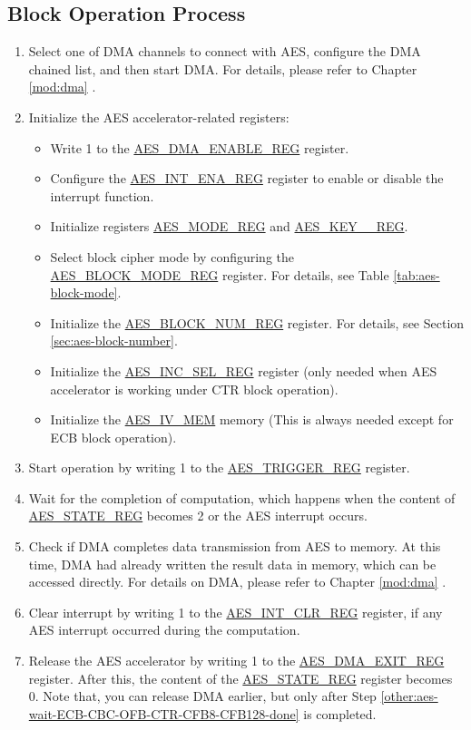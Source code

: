\documentclass[main\_\_EN.tex]{subfiles}
\begin{document}
\subsection{Block Operation Process}
\begin{enumerate}
    \item Select one of DMA channels to connect with AES, configure the DMA chained list, and then start DMA. For details, please refer to Chapter \ref{mod:dma} \textit{}.
    \item Initialize the AES accelerator-related registers:
    \begin{itemize}
        \item Write 1 to the \hyperref[regdesc:AESDMAENABLEREG]{AES\_DMA\_ENABLE\_REG} register.
        \item Configure the \hyperref[regdesc:AESINTENAREG]{AES\_INT\_ENA\_REG} register to enable or disable the interrupt function.
        \item Initialize registers \hyperref[regdesc:AESMODEREG]{AES\_MODE\_REG} and \hyperref[regdesc:AESKEYnREG]{AES\_KEY\_\_REG}.
        \item Select block cipher mode by configuring the \hyperref[regdesc:AESBLOCKMODEREG]{AES\_BLOCK\_MODE\_REG} register. For details, see Table \ref{tab:aes-block-mode}.
        \item Initialize the \hyperref[regdesc:AESBLOCKNUMREG]{AES\_BLOCK\_NUM\_REG} register. For details, see Section \ref{sec:aes-block-number}.
        \item Initialize the \hyperref[regdesc:AESINCSELREG]{AES\_INC\_SEL\_REG} register (only needed when AES accelerator is working under CTR block operation).
        \item Initialize the \hyperref[memdesc:AESIVMEM]{AES\_IV\_MEM} memory (This is always needed except for ECB block operation).
    \end{itemize}
    \item Start operation by writing 1 to the \hyperref[regdesc:AESTRIGGERREG]{AES\_TRIGGER\_REG} register.
    \item \label{other:aes-wait-ECB-CBC-OFB-CTR-CFB8-CFB128-done}
            Wait for the completion of computation, which happens when the content of \hyperref[regdesc:AESSTATEREG]{AES\_STATE\_REG} becomes 2 or the AES interrupt occurs.
    \item Check if DMA completes data transmission from AES to memory. At this time, DMA had already written the result data in memory, which can be accessed directly. For details on DMA, please refer to Chapter \ref{mod:dma} \textit{}.
    \item Clear interrupt by writing 1 to the \hyperref[regdesc:AESINTCLRREG]{AES\_INT\_CLR\_REG} register, if any AES interrupt occurred during the computation.
    \item Release the AES accelerator by writing 1 to the \hyperref[regdesc:AESDMAEXITREG]{AES\_DMA\_EXIT\_REG} register. After this, the content of the \hyperref[regdesc:AESSTATEREG]{AES\_STATE\_REG} register becomes 0.
    Note that, you can release DMA earlier, but only after Step \ref{other:aes-wait-ECB-CBC-OFB-CTR-CFB8-CFB128-done} is completed.
\end{enumerate}
\end{document}
